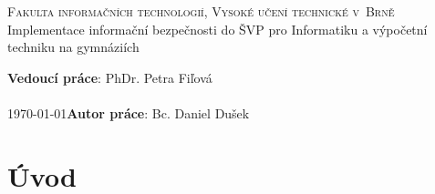 \documentclass[a4paper, 12pt]{article}
\title{\thesisname}
\author{Bc. Daniel Dušek}
\newcommand{\thesisname}{Implementace informační bezpečnosti do ŠVP pro Informatiku a výpočetní techniku na gymnáziích}
\begin{document}
\thispagestyle{empty}
\begin{center}
    \Huge
    \textsc{Fakulta informačních technologií, Vysoké učení technické v~Brně}\\
    \LARGE
    \thesisname
\end{center}
    {\Large \hfill \textbf{Vedoucí práce}: PhDr. Petra Fiľová}\\
    \\
    {\Large \today \hfill \textbf{Autor práce}: Bc. Daniel Dušek}~~~~~~~~\\





\newpage
\thispagestyle{empty}
\tableofcontents


\newpage
\setcounter{page}{1}
\section{Úvod}


% 
\end{document}
